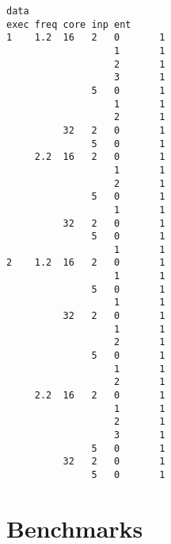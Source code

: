 \documentclass[11pt]{article}
\makeatletter
\newcommand{\boxspacing}{\kern\kvtcb@left@rule\kern\kvtcb@boxsep}
\newcommand{\prompt}[4]{
        \ttfamily\llap{{\color{#2}[#3]:\hspace{3pt}#4}}\vspace{-\baselineskip}
    }
\makeatother
\begin{document}
            \begin{tcolorbox}[breakable, size=fbox, boxrule=.5pt, pad at break*=1mm, opacityfill=0]
\prompt{Out}{outcolor}{0}{\boxspacing}
\begin{Verbatim}[commandchars=\\\{\}]
                        data
exec freq core inp ent
1    1.2  16   2   0       1
                   1       1
                   2       1
                   3       1
               5   0       1
                   1       1
                   2       1
          32   2   0       1
               5   0       1
     2.2  16   2   0       1
                   1       1
                   2       1
               5   0       1
                   1       1
          32   2   0       1
               5   0       1
                   1       1
2    1.2  16   2   0       1
                   1       1
               5   0       1
                   1       1
          32   2   0       1
                   1       1
                   2       1
               5   0       1
                   1       1
                   2       1
     2.2  16   2   0       1
                   1       1
                   2       1
                   3       1
               5   0       1
          32   2   0       1
               5   0       1
\end{Verbatim}
\end{tcolorbox}
        
    \hypertarget{benchmarks}{%
\section{Benchmarks}\label{benchmarks}}
\end{document}
